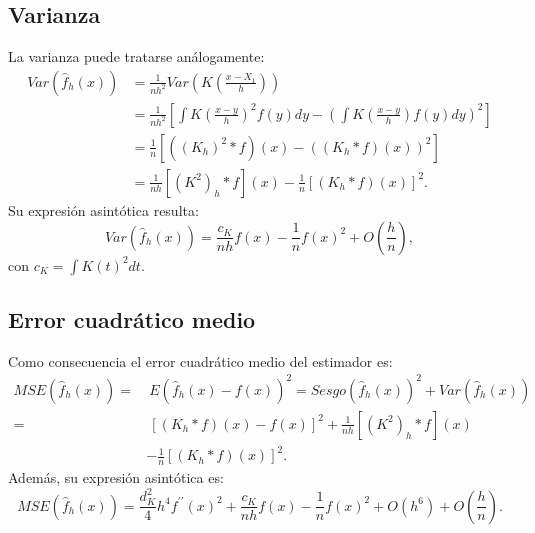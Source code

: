 \documentclass[]{book}
\theoremstyle{definition}
\theoremstyle{definition}
\theoremstyle{definition}
\theoremstyle{remark}
\begin{document}
\subsection{Varianza}\label{varianza}

La varianza puede tratarse análogamente: \[\begin{aligned}
Var\left( \hat{f}_{h}\left( x \right) \right) &= \frac{1}{nh^2}Var\left(
K\left( \frac{x-X_1}{h} \right) \right) \\
&= \frac{1}{nh^2}\left[ \int K\left( \frac{x-y}{h} \right)^2f\left(
y \right) dy-\left( \int K\left( \frac{x-y}{h} \right) f\left( y \right)
dy \right)^2\right] \\
&= \frac{1}{n}\left[ \left( \left( K_{h} \right)^2\ast f \right) \left(
x \right) -\left( \left( K_{h}\ast f \right) \left( x \right) \right)^2
\right] \\
&= \frac{1}{nh}\left[ \left( K^2 \right) _{h}\ast f\right] \left( x \right) -
\frac{1}{n}\left[ \left( K_{h}\ast f \right) \left( x \right) \right]^2.\end{aligned}\]Su
expresión asintótica resulta:
\[Var\left( \hat{f}_{h}\left( x \right) \right) =\frac{c_{K}}{nh}f\left(
x \right) - \frac{1}{n}f\left( x \right)^2 + O\left( \frac{h}{n} \right),\]
con \(c_{K}=\int K\left( t \right)^2dt\).

\subsection{Error cuadrático medio}\label{error-cuadratico-medio}

Como consecuencia el error cuadrático medio del estimador es:
\[\begin{aligned}
MSE\left( \hat{f}_{h}\left( x \right) \right) =&\ E\left( \hat{f}_{h}\left(
x \right) -f\left( x \right) \right)^2=Sesgo\left( \hat{f}_{h}\left(
x \right) \right)^2+Var\left( \hat{f}_{h}\left( x \right) \right) \\
=&\ \left[ \left( K_{h}\ast f \right) \left( x \right) -f\left( x \right) \right]
^2+\frac{1}{nh}\left[ \left( K^2 \right) _{h}\ast f\right] \left( x \right) \\
&-\frac{1}{n}\left[ \left( K_{h}\ast f \right) \left( x \right) \right]^2.
\end{aligned}\] Además, su expresión asintótica
es:\[MSE\left( \hat{f}_{h}\left( x \right) \right) =\frac{d_{K}^2}{4}
h^{4}f^{\prime \prime }\left( x \right)^2+\frac{c_{K}}{nh}f\left( x \right)
-\frac{1}{n}f\left( x \right)^2+O\left( h^{6} \right) +O\left( \frac{h}{n}
 \right).\]
\end{document}
